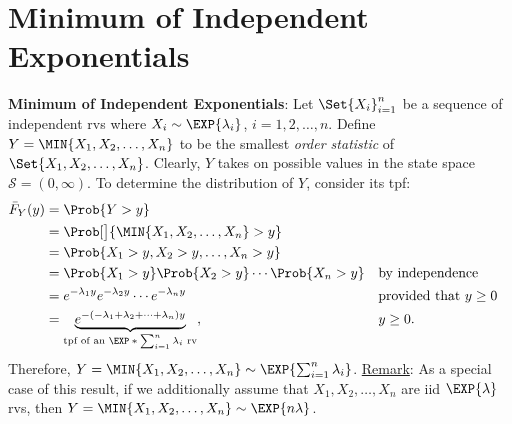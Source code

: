 \section*{Minimum of Independent Exponentials}
\begin{Regular}
    \textbf{Minimum of Independent Exponentials}: Let $ \Set{X_i}_{i=1}^n $ be a sequence of independent rvs where
    $ X_i \sim \EXP{\lambda_i} $, $ i=1,2,\ldots,n $. Define $ Y=\MIN{X_1,X_2,\ldots,X_n} $ to be the
    smallest \emph{order statistic} of $ \Set{X_1,X_2,\ldots,X_n} $. Clearly, $ Y $ takes on possible values
    in the state space $ \mathcal{S}=(0,\infty) $. To determine the distribution of $ Y $, consider its tpf:
    \begin{align*}
        \bar{F}_Y(y)
         & =\Prob{Y>y}                                                                                                                                                \\
         & =\Prob[\big]{\MIN{X_1,X_2,\ldots,X_n}>y}                                                                                                                   \\
         & =\Prob{X_1>y,X_2>y,\ldots,X_n>y}                                                                                                                           \\
         & =\Prob{X_1>y}\Prob{X_2>y}\cdots\Prob{X_n>y}                                                                           &  & \text{by independence}          \\
         & =e^{-\lambda_1y}e^{-\lambda_2y}\cdots e^{-\lambda_n y}                                                                &  & \text{provided that $ y\ge 0 $} \\
         & =\underbrace{e^{-(-\lambda_1+\lambda_2+\cdots+\lambda_n)y}}_{\text{tpf of an $ \EXP*{\sum_{i=1}^{n}\lambda_i} $ rv}}, &  & y\ge 0.
    \end{align*}
    Therefore, $ Y=\MIN{X_1,X_2,\ldots,X_n}\sim \EXP{\sum_{i=1}^{n}\lambda_i} $.
    \tcblower{}
    \underline{Remark}: As a special case of this result, if we additionally assume that $ X_1,X_2,\ldots,X_n $
    are iid $ \EXP{\lambda} $ rvs, then $ Y=\MIN{X_1,X_2,\ldots,X_n}\sim \EXP{n\lambda} $.
\end{Regular}
